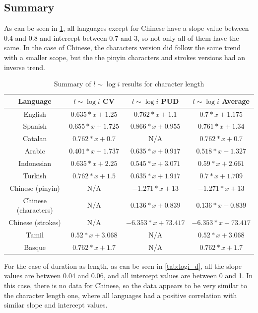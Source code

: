 \subsection{Summary}

As can be seen in \cref{tab:logi_cl}, all languages except for Chinese have a slope value between 0.4 and 0.8 and intercept between 0.7 and 3, so not only all of them have the same. In the case of Chinese, the characters version did follow the same trend with a smaller scope, but the the pinyin characters and strokes versions had an inverse trend.

\begin{table}[H]
    \centering
    \begin{tabular}{c|c|c|c}
        Language & $l \sim \log i$ CV & $l \sim \log i$ PUD & $l \sim \log i$ Average \\ \hline
        English & $0.635*x + 1.25$ & $0.762*x + 1.1$ & $0.7*x + 1.175$ \\
        Spanish & $0.655*x + 1.725$ & $0.866*x + 0.955$ & $0.761*x + 1.34$ \\
        Catalan & $0.762*x + 0.7$ & N/A & $0.762*x + 0.7$ \\
        Arabic & $0.401*x + 1.737$ & $0.635*x + 0.917$ & $0.518*x + 1.327$ \\
        Indonesian & $0.635*x + 2.25$ & $0.545*x + 3.071$ & $0.59*x + 2.661$ \\
        Turkish & $0.762*x + 1.5$ & $0.635*x + 1.917$ & $0.7*x + 1.709$ \\
        Chinese (pinyin) & N/A & $-1.271*x + 13$ & $-1.271*x + 13$ \\
        Chinese (characters) & N/A & $0.136*x + 0.839$ & $0.136*x + 0.839$ \\
        Chinese (strokes) & N/A & $-6.353*x + 73.417$ & $-6.353*x + 73.417$ \\
        Tamil & $0.52*x + 3.068$ & N/A & $0.52*x + 3.068$ \\
        Basque & $0.762*x + 1.7$ & N/A & $0.762*x + 1.7$ \\
    \end{tabular}
    \caption{Summary of $l \sim \log i$ results for character length}
    \label{tab:logi_cl}
\end{table}

For the case of duration as length, as can be seen in \cref{tab:logi_d}, all the slope values are between 0.04 and 0.06, and all intercept values are between 0 and 1. In this case, there is no data for Chinese, so the data appears to be very similar to the character length one, where all languages had a positive correlation with similar slope and intercept values.

